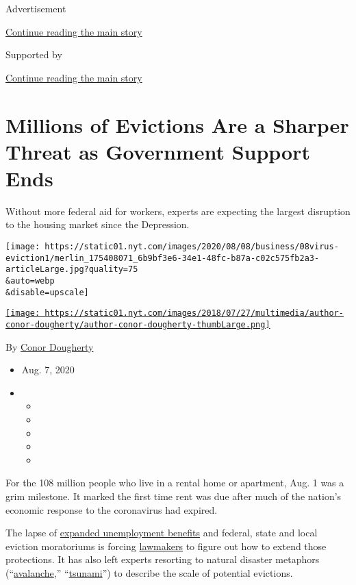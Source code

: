 Advertisement

\protect\hyperlink{after-top}{Continue reading the main story}

Supported by

\protect\hyperlink{after-sponsor}{Continue reading the main story}

\hypertarget{millions-of-evictions-are-a-sharper-threat-as-government-support-ends}{%
\section{Millions of Evictions Are a Sharper Threat as Government
Support
Ends}\label{millions-of-evictions-are-a-sharper-threat-as-government-support-ends}}

Without more federal aid for workers, experts are expecting the largest
disruption to the housing market since the Depression.

\texttt{[image: https://static01.nyt.com/images/2020/08/08/business/08virus-eviction1/merlin\_175408071\_6b9bf3e6-34e1-48fc-b87a-c02c575fb2a3-articleLarge.jpg?quality=75\\\&auto=webp\\\&disable=upscale]}

\href{https://www.nytimes.com/by/conor-dougherty}{\texttt{[image: https://static01.nyt.com/images/2018/07/27/multimedia/author-conor-dougherty/author-conor-dougherty-thumbLarge.png]}}

By \href{https://www.nytimes.com/by/conor-dougherty}{Conor Dougherty}

\begin{itemize}
\item
  Aug. 7, 2020
\item
  \begin{itemize}
  \item
  \item
  \item
  \item
  \item
  \end{itemize}
\end{itemize}

For the 108 million people who live in a rental home or apartment, Aug.
1 was a grim milestone. It marked the first time rent was due after much
of the nation's economic response to the coronavirus had expired.

The lapse of
\href{https://www.nytimes.com/2020/08/06/business/coronavirus-jobs-report-trump-congress-stimulus.html}{expanded
unemployment benefits} and federal, state and local eviction moratoriums
is forcing
\href{https://www.latimes.com/california/story/2020-08-05/california-legislative-leaders-judicial-council-delay-lifting-eviction-moratorium-coronavirus}{lawmakers}
to figure out how to extend those protections. It has also left experts
resorting to natural disaster metaphors
(``\href{https://www.nytimes.com/2020/05/27/us/coronavirus-evictions-renters.html}{avalanche},''
``\href{https://www.nbcnews.com/business/business-news/tsunami-evictions-coming-warn-housing-advocates-n1233965}{tsunami}'')
to describe the scale of potential evictions.

